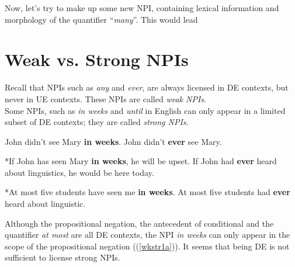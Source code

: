 \documentclass[a4paper,11pt]{article}
\newcommand{\reff}[1]{(\ref{#1})}
\begin{document}
Now, let's try to make up some new NPI, containing lexical information and morphology of the quantifier \enquote{\emph{many}}. This would lead
\section{Weak vs. Strong NPIs}



Recall that NPIs such as \textit{any} and \textit{ever}, are always licensed in DE contexts, but never in UE contexts. These NPIs are called \textit{weak NPIs}. 
\\Some NPIs, such as \textit{in weeks} and \textit{until} in English can only appear in a limited subset of DE contexts; they are called \textit{strong NPIs}.
\begin{exe}
\ex\label{wkstr} \begin{xlist}
\ex\label{wkstr1} \begin{xlist}
\ex\label{wkstr1a} John didn't see Mary \textbf{in weeks}. 
\ex\label{wkstr1b} John didn't \textbf{ever} see Mary. 
\end{xlist}
\ex\label{wkstr2} \begin{xlist}
\ex\label{wkstr2a} *If John has seen Mary \textbf{in weeks}, he will be upset.
\ex\label{wkstr2b} If John had \textbf{ever} heard about linguistics, he would be here today.
\end{xlist}
\ex\label{wkstr3} \begin{xlist}
\ex\label{wkstr3a} *At most five students have seen me \textbf{in weeks}.
\ex\label{wkstr3b} At most five students had \textbf{ever} heard about linguistic.
\end{xlist}
\end{xlist}
\end{exe}
Although the propositional negation, the antecedent of conditional and the quantifier \textit{at most} are all DE contexts, the NPI \textit{in weeks} can only appear in the scope of the propositional negation (\reff{wkstr1a}). It seems that being DE is not sufficient to license strong NPIs.
\end{document}
